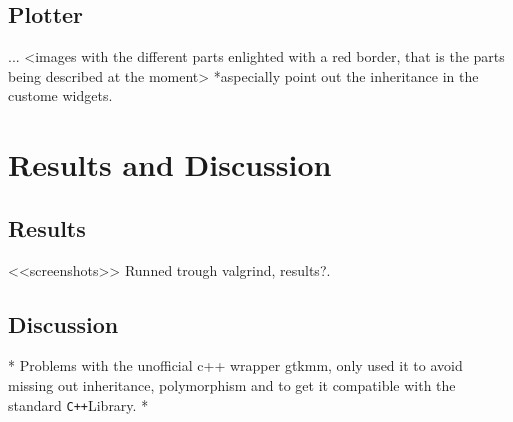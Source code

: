 \documentclass[a4paper,11pt]{kth-mag}
\newcommand{\Cpp}{\texttt{C++}}
\begin{document}
\section{Plotter}
...
<images with the different parts enlighted with a red border, that is the parts being described at the moment>
*aspecially point out the inheritance in the custome widgets.

\chapter{Results and Discussion}

\section{Results}
<<screenshots>>
Runned trough valgrind, results?.

\section{Discussion}
* Problems with the unofficial c++ wrapper gtkmm, only used it to avoid missing out inheritance, polymorphism and to get it compatible with the standard \Cpp Library. 
* 
\end{document}
